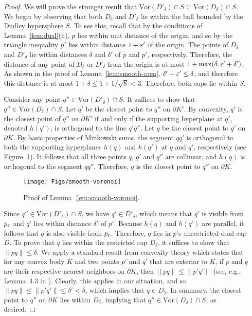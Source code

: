 \documentclass[11pt]{article}   \usepackage[letterpaper,hmargin=2.1cm,vmargin=3cm]{geometry}
\newcommand{\Vor}{\mathrm{Vor}}
\begin{document}
\begin{proof}
We will prove the stronger result that $\Vor(D'_{\delta}) \cap S \subseteq \Vor(D_{\delta}) \cap S$. We begin by observing that both $D_{\delta}$ and $D'_{\delta}$ lie within the ball bounded by the Dudley hypersphere $S$. To see this, recall that by the conditions of Lemma~\ref{lem:dual}(ii), $p$ lies within unit distance of the origin, and so by the triangle inequality $p'$ lies within distance $1 + \varepsilon'$ of the origin. The points of $D_{\delta}$ and $D'_{\delta}$ lie within distances $\delta$ and $\delta'$ of $p$ and $p'$, respectively. Therefore, the distance of any point of $D_{\delta}$ or $D'_{\delta}$ from the origin is at most $1 + \max(\delta, \varepsilon' + \delta')$. As shown in the proof of Lemma~\ref{lem:smooth-area}, $\delta' + \varepsilon' \le \delta$, and therefore this distance is at most $1 + \delta \le 1 + 1/\sqrt{8} < 3$. Therefore, both caps lie within $S$. 

Consider any point $q'' \in \Vor(D'_{\delta}) \cap S$. It suffices to show that $q'' \in \Vor(D_{\delta}) \cap S$. Let $q'$ be the closest point to $q''$ on $\partial K'$. By convexity, $q'$ is the closest point of $q''$ on $\partial K'$ if and only if the supporting hyperplane at $q'$, denoted $h(q')$, is orthogonal to the line $q' q''$.  Let $q$ be the closest point to $q'$ on $\partial K$. By basic properties of Minkowski sums, the segment $q q'$ is orthogonal to both the supporting hyperplanes $h(q)$ and $h(q')$ at $q$ and $q'$, respectively (see Figure~\ref{fig:smooth-voronoi}). It follows that all three points $q$, $q'$ and $q''$ are collinear, and $h(q)$ is orthogonal to the segment $q q''$. Therefore, $q$ is the closest point to $q''$ on $\partial K$.

\begin{figure}[htbp]
  \centerline{\texttt{[image: Figs/smooth-voronoi]}}
  \caption{Proof of Lemma~\ref{lem:smooth-voronoi}.}
  \label{fig:smooth-voronoi}
\end{figure}


Since $q'' \in \Vor(D'_{\delta}) \cap S$, we have $q' \in D'_{\delta}$, which means that $q'$ is visible from $p_{\varepsilon}$ and $q'$ lies within distance $\delta'$ of $p'$. Because $h(q)$ and $h(q')$ are parallel, it follows that $q$ is also visible from $p_{\varepsilon}$. Therefore, $q$ lies in $p$'s unrestricted dual cap $D$. To prove that $q$ lies within the restricted cap $D_{\delta}$, it suffices to show that $\|p q\| \le \delta$. We apply a standard result from convexity theory which states that for any convex body $K$ and two points $p'$ and $q'$ that are exterior to $K$, if $p$ and $q$ are their respective nearest neighbors on $\partial K$, then $\|p q\| \le \|p' q'\|$ (see, e.g., Lemma~{4.3} in \cite{Dudley}). Clearly, this applies in our situation, and so $\|p q\| \le \|p' q'\| \le \delta' < \delta$, which implies that $q \in D_{\delta}$. In summary, the closest point to $q''$ on $\partial K$ lies within $D_{\delta}$, implying that $q'' \in \Vor(D_{\delta}) \cap S$, as desired.
\end{proof}
\end{document}
